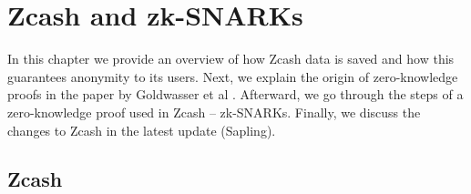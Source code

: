 
\chapter{Zcash and zk-SNARKs} %

\label{Chapter3} %

In this chapter we provide an overview of how Zcash data is saved and how this guarantees anonymity to its users. Next, we explain the origin of zero-knowledge proofs in the paper by Goldwasser et al \cite{goldwasser1985knowledge}. Afterward, we go through the steps of a zero-knowledge proof used in Zcash -- zk-SNARKs. Finally, we discuss the changes to Zcash in the latest update (Sapling).
\section{Zcash}

